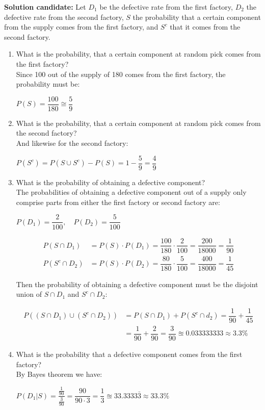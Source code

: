 \documentclass{report}
\newcommand{\cent}[1]{\begin{center}#1\end{center}}
\newcommand{\mAlign}[1]{\begin{align*}#1\end{align*}}
\newcommand{\Solution}{\textbf{Solution candidate: }}
\newcommand{\defaultEnumerateLabel}{\textbf{\alph*.}}
\newcommand{\MyItem}[1]{\item #1\\}
\newcommand{\LetterEnumeration}[1]{\begin{enumerate}[label = \defaultEnumerateLabel]
		#1
\end{enumerate}}
\begin{document}
 	\Solution
 	Let  $D_1$ be the defective rate from the first factory, $D_2$ the defective rate from the second factory, $S$ the probability that a certain component from the supply comes from the first factory, and $S^c$ that it comes from the second factory.
 	
 	\LetterEnumeration{
 		\MyItem{What is the probability, that a certain component at random pick comes from the first factory?}
 		
 		Since 100 out of the supply of 180 comes from the first factory, the probability must be:
 		
 		\cent{ $P(S) = \dfrac{100}{180} \cong \dfrac{5}{9}$}
 		
 		\MyItem{What is the probability, that a certain component at random pick comes from the second factory?}
 		
 		And likewise for the second factory:
 		
 		\cent{$P(S^c) = P(S \cup S^c) - P(S) = 1-\dfrac{5}{9} = \dfrac{4}{9} $}
 		
 		\MyItem{What is the probability of obtaining a defective component?}
 		
 		The probabilities of obtaining a defective component out of a supply only comprise parts from either the first factory or second factory are:
 		
 		\cent{$ P(D_1) = \dfrac{2}{100}, \quad P(D_2) = \dfrac{5}{100}$}
 		
 		\mAlign{
 			P(S \cap D_1) &= P(S) \cdot P(D_1) = \dfrac{100}{180} \cdot \dfrac{2}{100} = \dfrac{200}{18000} = \dfrac{1}{90}\\
 			P(S^c \cap D_2) &= P(S) \cdot P(D_2) = \dfrac{80}{180} \cdot \dfrac{5}{100} = \dfrac{400}{18000} = \dfrac{1}{45}
 		}
 	
 		Then the probability of obtaining a defective component must be the disjoint union of $S \cap D_1$ and $S^c \cap D_2$:
 		
 		\mAlign{
 			P((S \cap D_1) \cup (S^c \cap D_2)) &= P(S \cap D_1 ) + P(S^c \cap d_2) = \dfrac{1}{90} + \dfrac{1}{45} \\
 																		   &= \dfrac{1}{90} + \dfrac{2}{90} = \dfrac{3}{90} \approxeq 0.033333333 \approx 3.3\%
 		}
 		
 		\MyItem{What is the probability that a defective component comes from the first factory?}
 		
 		By Bayes theorem we have:
 		
 		\cent{$ P(D_1 | S)  = \dfrac{\frac{1}{90}}{\frac{3}{90}} = \dfrac{90}{90 \cdot 3} = \dfrac{1}{3} \approxeq 33.3333\bar{3} \approx 33.3 \%$}
 	}
 	
\end{document}
